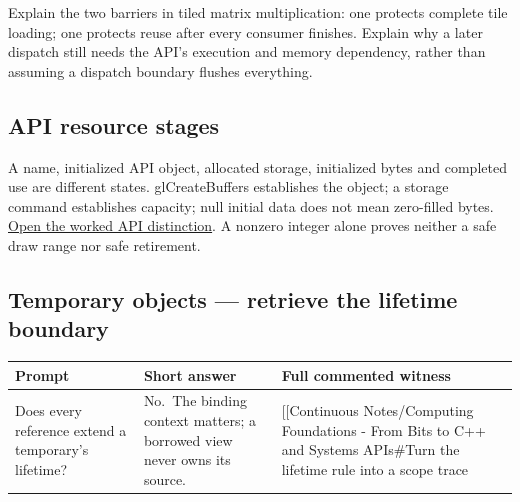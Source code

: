 Explain the two barriers in tiled matrix multiplication: one protects complete tile loading; one protects reuse after every consumer finishes. Explain why a later dispatch still needs the API's execution and memory dependency, rather than assuming a dispatch boundary flushes everything.

\subsection{API resource stages}\label{api-resource-stages}

A name, initialized API object, allocated storage, initialized bytes and completed use are different states. glCreateBuffers establishes the object; a storage command establishes capacity; null initial data does not mean zero-filled bytes. \href{Continuous\%20Notes/Computing\%20Foundations\%20-\%20From\%20Bits\%20to\%20C++\%20and\%20Systems\%20APIs\#A\%20buffer\%20name,\%20an\%20API\%20object,\%20and\%20its\%20storage\%20are\%20separate}{Open the worked API distinction}. A nonzero integer alone proves neither a safe draw range nor safe retirement.

\subsection{Temporary objects --- retrieve the lifetime boundary}\label{temporary-objects-retrieve-the-lifetime-boundary}

{\def\LTcaptype{none} %
\begin{longtable}[]{@{}
  >{\raggedright\arraybackslash}p{}
  >{\raggedright\arraybackslash}p{}
  >{\raggedright\arraybackslash}p{}@{}}
\toprule\noalign{}
\begin{minipage}[b]{\linewidth}\raggedright
Prompt
\end{minipage} & \begin{minipage}[b]{\linewidth}\raggedright
Short answer
\end{minipage} & \begin{minipage}[b]{\linewidth}\raggedright
Full commented witness
\end{minipage} \\
\midrule\noalign{}
\endhead
\bottomrule\noalign{}
\endlastfoot
Does every reference extend a temporary's lifetime? & No.~The binding context matters; a borrowed view never owns its source. & {[}{[}Continuous Notes/Computing Foundations - From Bits to C++ and Systems APIs\#Turn the lifetime rule into a scope trace \\
\end{longtable}
}
